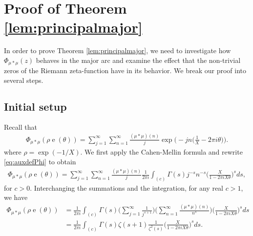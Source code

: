 \documentclass[11pt]{amsart}
\numberwithin{equation}{section}
\numberwithin{figure}{section}
\theoremstyle{definition}
\newcommand{\e}{\operatorname{e}}
\begin{document}
\section{Proof of Theorem \ref{lem:principalmajor}}\label{sec:principalarc}
In order to prove Theorem \ref{lem:principalmajor}, we need to investigate how $\Phi_{\mu*\mu}(z)$ behaves in the major arc and examine the effect that the non-trivial zeros of the Riemann zeta-function have in its behavior. We break our proof into several steps. 
\subsection*{Initial setup} Recall that
\begin{align} \label{eq:auxdefPhi}
    \Phi_{\mu * \mu}(\rho \e(\theta)) = \sum_{j=1}^\infty \sum_{n=1}^\infty \frac{(\mu * \mu)(n)}{j} \exp\bigg( -jn \bigg(\frac{1}{X}-2\pi i \theta\bigg)\bigg).
\end{align}
where $\rho =\exp(-1/X)$. We first apply the Cahen-Mellin formula and rewrite \eqref{eq:auxdefPhi} to obtain
\begin{align*}
    \Phi_{\mu * \mu}(\rho \e(\theta)) = \sum_{j=1}^\infty \sum_{n=1}^\infty \frac{(\mu * \mu)(n)}{j} \frac{1}{2 \pi i} \int_{(c)} \Gamma(s) j^{-s} n^{-s} \bigg(\frac{X}{1-2\pi i X \theta}\bigg)^s ds,
\end{align*}
for $c>0$. Interchanging the summations and the integration, for any real $c>1$, we have
\begin{align}
\Phi_{\mu * \mu}(\rho \e(\theta)) &= \frac{1}{2 \pi i} \int_{(c)} \Gamma(s) \bigg(\sum_{j=1}^\infty \frac{1}{j^{s+1}}\bigg) \bigg(\sum_{n=1}^\infty \frac{(\mu * \mu)(n)}{n^s} \bigg) \bigg(\frac{X}{1-2\pi i X \theta}\bigg)^s ds \nonumber \\
&= \frac{1}{2 \pi i} \int_{(c)} \Gamma(s) \zeta(s+1) \frac{1}{\zeta^2(s)} \bigg(\frac{X}{1-2\pi i X \theta}\bigg)^s ds. \label{Initial Step Sec 8}
\end{align}
\end{document}
